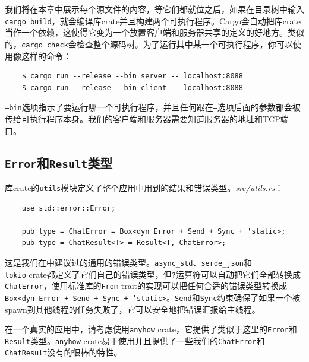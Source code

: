 我们将在本章中展示每个源文件的内容，等它们都就位之后，如果在目录树中输入\texttt{cargo build}，就会编译库crate并且构建两个可执行程序。Cargo会自动把库crate当作一个依赖，这使得它变为一个放置客户端和服务器共享的定义的好地方。类似的，\texttt{cargo check}会检查整个源码树。为了运行其中某一个可执行程序，你可以使用像这样的命令：
\begin{verbatim}
    $ cargo run --release --bin server -- localhost:8088
    $ cargo run --release --bin client -- localhost:8088
\end{verbatim}

\texttt{--bin}选项指示了要运行哪一个可执行程序，并且任何跟在\texttt{--}选项后面的参数都会被传给可执行程序本身。我们的客户端和服务器需要知道服务器的地址和TCP端口。

\subsection{\texttt{Error}和\texttt{Result}类型}
库crate的\texttt{utils}模块定义了整个应用中用到的结果和错误类型。\emph{src/utils.rs}：
\begin{verbatim}
    use std::error::Error;

    pub type = ChatError = Box<dyn Error + Send + Sync + 'static>;
    pub type = ChatResult<T> = Result<T, ChatError>;
\end{verbatim}

这是我们在中建议过的通用的错误类型。\texttt{async\_std}、\texttt{serde\_json}和\\
\texttt{tokio} crate都定义了它们自己的错误类型，但\texttt{?}运算符可以自动把它们全部转换成\texttt{ChatError}，使用标准库的\texttt{From} trait的实现可以把任何合适的错误类型转换成\texttt{Box<dyn Error + Send + Sync + 'static>}。\texttt{Send}和\texttt{Sync}约束确保了如果一个被spawn到其他线程的任务失败了，它可以安全地把错误汇报给主线程。

在一个真实的应用中，请考虑使用\texttt{anyhow} crate，它提供了类似于这里的\texttt{Error}和\texttt{Result}类型。\texttt{anyhow} crate易于使用并且提供了一些我们的\texttt{ChatError}和\texttt{ChatResult}没有的很棒的特性。

